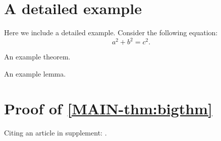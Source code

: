 \documentclass[review,supplement]{siamart}
\begin{document}
\TitleAndAuthorCommands
\maketitle

\PageHeaderCommands

\section{A detailed example}

Here we include a detailed example.
Consider the following equation:
\begin{equation}
  \label{eq:suppa}
  a^2 + b^2 = c^2.
\end{equation}

\lipsum[100-101]

\begin{theorem}
  An example theorem.
\end{theorem}

\lipsum[102]
 
\begin{lemma}
  An example lemma.
\end{lemma}

\lipsum[103-105]

\section{Proof of \cref{MAIN-thm:bigthm}}
\label{sec:proof}

\lipsum[106-115]

Citing an article in supplement: \cite{KoMa14}.



\end{document}
